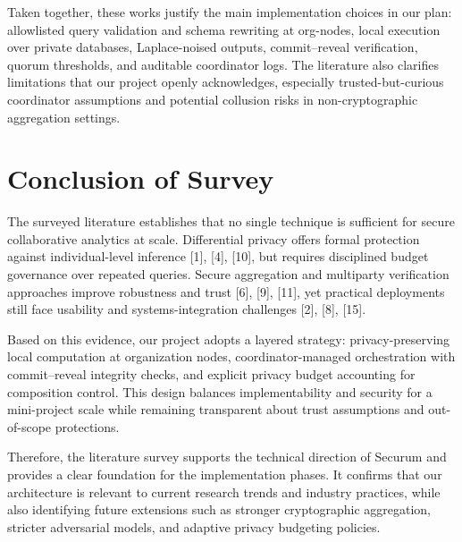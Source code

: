 Taken together, these works justify the main implementation choices in our plan: allowlisted query validation and schema rewriting at org-nodes, local execution over private databases, Laplace-noised outputs, commit--reveal verification, quorum thresholds, and auditable coordinator logs. The literature also clarifies limitations that our project openly acknowledges, especially trusted-but-curious coordinator assumptions and potential collusion risks in non-cryptographic aggregation settings.

\section{Conclusion of Survey}

The surveyed literature establishes that no single technique is sufficient for secure collaborative analytics at scale. Differential privacy offers formal protection against individual-level inference [1], [4], [10], but requires disciplined budget governance over repeated queries. Secure aggregation and multiparty verification approaches improve robustness and trust [6], [9], [11], yet practical deployments still face usability and systems-integration challenges [2], [8], [15].

Based on this evidence, our project adopts a layered strategy: privacy-preserving local computation at organization nodes, coordinator-managed orchestration with commit--reveal integrity checks, and explicit privacy budget accounting for composition control. This design balances implementability and security for a mini-project scale while remaining transparent about trust assumptions and out-of-scope protections.

Therefore, the literature survey supports the technical direction of Securum and provides a clear foundation for the implementation phases. It confirms that our architecture is relevant to current research trends and industry practices, while also identifying future extensions such as stronger cryptographic aggregation, stricter adversarial models, and adaptive privacy budgeting policies.
